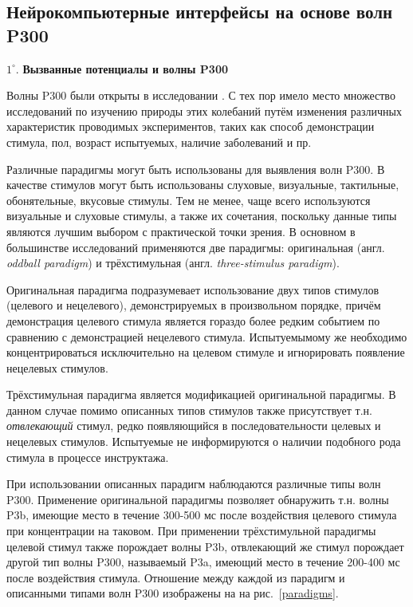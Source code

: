 \documentclass[12pt,fleqn]{article}
\begin{document}
	\subsection{Нейрокомпьютерные интерфейсы на основе волн P300}
	\par $1^{\circ}.$ {\bf Вызванные потенциалы и волны P300}
	\par Волны P300 были открыты в исследовании \cite{P300_first}. С тех пор имело место множество исследований по изучению природы этих колебаний путём изменения различных характеристик проводимых экспериментов, таких как способ демонстрации стимула, пол, возраст испытуемых, наличие заболеваний  и пр.
	\par Различные парадигмы могут быть использованы для выявления волн P300. В качестве стимулов могут быть использованы слуховые, визуальные, тактильные, обонятельные, вкусовые стимулы. Тем не менее, чаще всего используются визуальные и слуховые стимулы, а также их сочетания, поскольку данные типы являются лучшим выбором с практической точки зрения. В основном в большинстве исследований применяются две парадигмы: оригинальная (англ. {\it oddball paradigm}) и трёхстимульная (англ. {\it three-stimulus paradigm}).
	\par Оригинальная парадигма подразумевает использование двух типов стимулов (целевого и нецелевого), демонстрируемых в произвольном порядке, причём демонстрация целевого стимула является гораздо более редким событием по сравнению с демонстрацией нецелевого стимула. Испытуемымому же необходимо концентрироваться исключительно на целевом стимуле и игнорировать появление нецелевых стимулов.
	\par Трёхстимульная парадигма является модификацией оригинальной парадигмы. В данном случае помимо описанных типов стимулов также присутствует т.н. {\it отвлекающий} стимул, редко появляющийся в последовательности целевых и нецелевых стимулов. Испытуемые не информируются о наличии подобного рода стимула в процессе инструктажа.
	\par При использовании описанных парадигм наблюдаются различные типы волн P300. Применение оригинальной парадигмы позволяет обнаружить т.н. волны P3b, имеющие место в течение 300-500 мс после воздействия целевого стимула при концентрации на таковом. При применении трёхстимульной парадигмы целевой стимул также порождает волны P3b, отвлекающий же стимул порождает другой тип волны P300, называемый P3a, имеющий место в течение 200-400 мс после воздействия стимула. Отношение между каждой из парадигм и описанными типами волн P300 изображены на на рис.~\ref{paradigms}.
\end{document}
